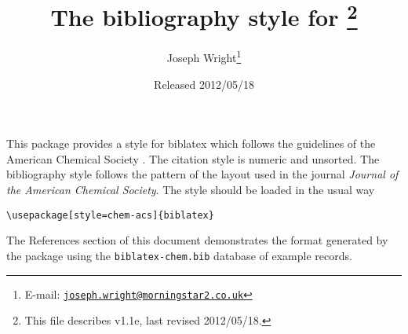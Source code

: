 \documentclass[a4paper]{ltxdoc}
\author{Joseph Wright\thanks{E-mail: 
  \href{mailto:joseph.wright@morningstar2.co.uk}
  {\texttt{joseph.wright@morningstar2.co.uk}}}}
\title{The \pkg{chem-acs} bibliography style for \pkg{biblatex}%
  \footnote{This file describes v1.1e, last revised 2012/05/18.}}
\date{Released 2012/05/18}
\providecommand*\pkg[1]{\textsf{#1}}
\begin{document}
\maketitle

This package provides a style for \pkg{biblatex} which follows the
guidelines of the American Chemical Society \autocite{Coghill2006}.
The citation style is numeric
and unsorted. The bibliography style follows the pattern of the layout
used in the journal \emph{Journal of the American Chemical Society}. The
style should be loaded in the usual way
\begin{verbatim}
\usepackage[style=chem-acs]{biblatex}
\end{verbatim}
The References section of this document demonstrates the format 
generated by the package using the \texttt{biblatex-chem.bib} database
of example records.

\nocite{*}

\printbibliography
\end{document}
